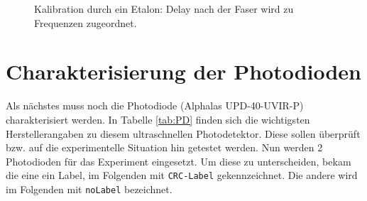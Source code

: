 \documentclass[bachelor,       %
               twoside,        %
               BCOR10mm,       %
               english,ngerman, %
               ]{GAUBM}
\begin{document}
 \begin{figure}[!htb]
   \centering
   \hfill
   \hfill
   \caption{Kalibration durch ein Etalon: Delay nach der Faser wird zu Frequenzen zugeordnet.}
   \label{fig:caliEtalon}
 \end{figure}

\section{Charakterisierung der Photodioden}
Als nächstes muss noch die Photodiode (Alphalas UPD-40-UVIR-P) charakterisiert werden.
In Tabelle \ref{tab:PD} finden sich die wichtigsten Herstellerangaben zu diesem ultraschnellen Photodetektor.
Diese sollen überprüft bzw. auf die experimentelle Situation hin getestet werden.
Nun werden 2 Photodioden für das Experiment eingesetzt.
Um diese zu unterscheiden, bekam die eine ein Label, im Folgenden mit \texttt{CRC-Label} gekennzeichnet.
Die andere wird im Folgenden mit \texttt{noLabel} bezeichnet.
\end{document}

